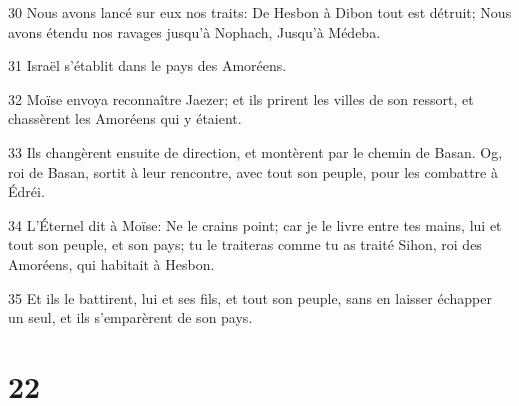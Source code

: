 \par 30 Nous avons lancé sur eux nos traits: De Hesbon à Dibon tout est détruit; Nous avons étendu nos ravages jusqu'à Nophach, Jusqu'à Médeba.
\par 31 Israël s'établit dans le pays des Amoréens.
\par 32 Moïse envoya reconnaître Jaezer; et ils prirent les villes de son ressort, et chassèrent les Amoréens qui y étaient.
\par 33 Ils changèrent ensuite de direction, et montèrent par le chemin de Basan. Og, roi de Basan, sortit à leur rencontre, avec tout son peuple, pour les combattre à Édréi.
\par 34 L'Éternel dit à Moïse: Ne le crains point; car je le livre entre tes mains, lui et tout son peuple, et son pays; tu le traiteras comme tu as traité Sihon, roi des Amoréens, qui habitait à Hesbon.
\par 35 Et ils le battirent, lui et ses fils, et tout son peuple, sans en laisser échapper un seul, et ils s'emparèrent de son pays.

\chapter{22}

